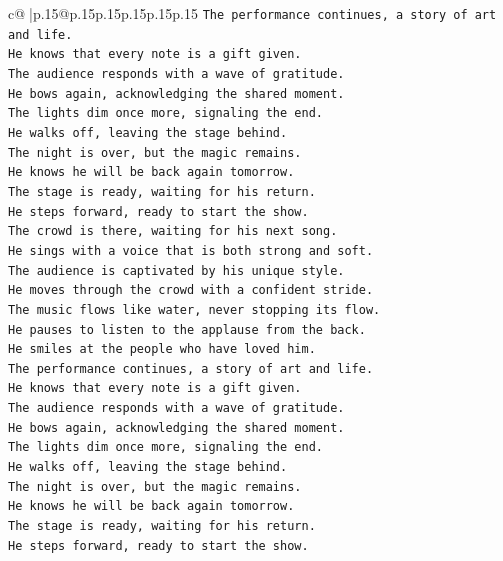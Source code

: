 \documentclass{article}
\begin{document}
{\begin{supertabular}{c@{$\;$}|p{.15\linewidth}@{}p{.15\linewidth}p{.15\linewidth}p{.15\linewidth}p{.15\linewidth}p{.15\linewidth}}
{{{\texttt{The performance continues, a story of art and life.} \\
\texttt{He knows that every note is a gift given.} \\
\texttt{The audience responds with a wave of gratitude.} \\
\texttt{He bows again, acknowledging the shared moment.} \\
\texttt{The lights dim once more, signaling the end.} \\
\texttt{He walks off, leaving the stage behind.} \\
\texttt{The night is over, but the magic remains.} \\
\texttt{He knows he will be back again tomorrow.} \\
\texttt{The stage is ready, waiting for his return.} \\
\texttt{He steps forward, ready to start the show.} \\
\texttt{The crowd is there, waiting for his next song.} \\
\texttt{He sings with a voice that is both strong and soft.} \\
\texttt{The audience is captivated by his unique style.} \\
\texttt{He moves through the crowd with a confident stride.} \\
\texttt{The music flows like water, never stopping its flow.} \\
\texttt{He pauses to listen to the applause from the back.} \\
\texttt{He smiles at the people who have loved him.} \\
\texttt{The performance continues, a story of art and life.} \\
\texttt{He knows that every note is a gift given.} \\
\texttt{The audience responds with a wave of gratitude.} \\
\texttt{He bows again, acknowledging the shared moment.} \\
\texttt{The lights dim once more, signaling the end.} \\
\texttt{He walks off, leaving the stage behind.} \\
\texttt{The night is over, but the magic remains.} \\
\texttt{He knows he will be back again tomorrow.} \\
\texttt{The stage is ready, waiting for his return.} \\
\texttt{He steps forward, ready to start the show.} \\
}}}
\end{supertabular}}
\end{document}
